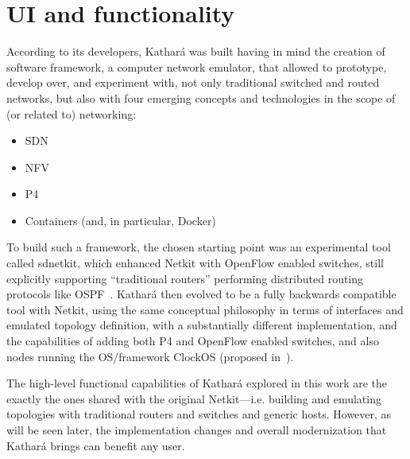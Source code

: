 \section{UI and functionality}
\label{sec:katharafunctionality}

According to its developers, Kathará was built having in mind the creation of software framework, a computer network emulator, that allowed to prototype, develop over, and experiment with, not only traditional switched and routed networks, but also with four emerging concepts and technologies in the scope of (or related to) networking:
\begin{itemize}
	\item SDN
	\item NFV
	\item P4~\cite{p4programming} %
	\item Containers (and, in particular, Docker)
\end{itemize}

To build such a framework, the chosen starting point was an experimental tool called sdnetkit, which enhanced Netkit with OpenFlow enabled switches, still explicitly supporting ``traditional routers'' performing distributed routing protocols like OSPF~\cite{sdnkit}.
Kathará then evolved to be a fully backwards compatible tool with Netkit, using the same conceptual philosophy in terms of interfaces and emulated topology definition, with a substantially different implementation, and the capabilities of adding both P4 and OpenFlow enabled switches, and also nodes running the OS/framework ClockOS (proposed in~\cite{clickos}).

The high-level functional capabilities of Kathará explored in this work are the exactly the ones shared with the original Netkit---i.e. building and emulating topologies with traditional routers and switches and generic hosts.
However, as will be seen later, the implementation changes and overall modernization that Kathará brings can benefit any user.

